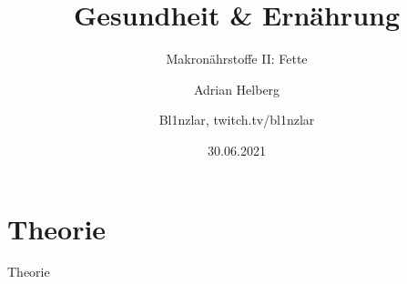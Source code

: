 \documentclass[xcolor=dvipsnames]{beamer}
\title{Gesundheit \& Ernährung}
\subtitle{Makronährstoffe II: Fette}
\author{Adrian Helberg}
\author{Bl1nzlar, twitch.tv/bl1nzlar}
\date{30.06.2021}
\begin{document}
    \maketitle


    \section{Theorie}
    {
    \begin{frame}
        \begin{center}
            \Huge Theorie
        \end{center}
    \end{frame}
    }
\end{document}
